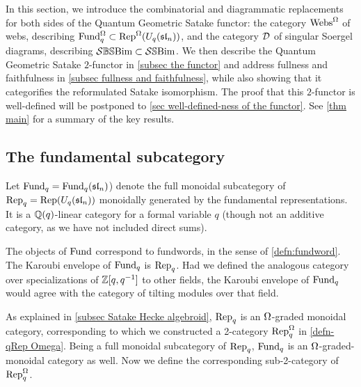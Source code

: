 In this section, we introduce the combinatorial and diagrammatic replacements for both sides of the Quantum Geometric Satake functor: the category $\operatorname{Webs}^{\Omega}$ of webs, describing $\operatorname{Fund}_q^{\Omega} \subset \operatorname{Rep}^{\Omega}(U_q(\mathfrak{sl}_n))$, and the category $\mathcal{D}$ of singular Soergel diagrams, describing $\mathcal{S}\mathbb{BS}\text{Bim} \subset \mathcal{S}\mathbb{S}\text{Bim}$. We then  describe the Quantum Geometric Satake $2$-functor in \cref{subsec the functor} and address fullness and faithfulness in \cref{subsec fullness and faithfulness}, while also showing that it categorifies the reformulated Satake isomorphism. 
The proof that this $2$-functor is well-defined will be postponed to \cref{sec well-defined-ness of the functor}. See \cref{thm main} for a summary of the key results.



\subsection{The fundamental subcategory}\label{subsec the fundamental subcategory}

\begin{defn} Let $\operatorname{Fund}_q = \operatorname{Fund}_q(\mathfrak{sl}_n)$) denote the full monoidal subcategory of $\operatorname{Rep}_q = \operatorname{Rep}(U_q(\mathfrak{sl}_n))$ monoidally generated by the fundamental representations. It is a $\mathbb{Q}(q)$-linear category for a formal variable $q$ (though not an additive category, as we have not included direct sums). \end{defn}

The objects of $\operatorname{Fund}$ correspond to fundwords, in the sense of \cref{defn:fundword}. The Karoubi envelope of $\operatorname{Fund}_q$ is $\operatorname{Rep}_q$. Had we defined the analogous category over specializations of $\mathbb{Z}[q,q^{-1}]$ to other fields, the Karoubi envelope of $\operatorname{Fund}_q$ would agree with the category of tilting modules over that field.

As explained in \cref{subsec Satake Hecke algebroid}, $\operatorname{Rep}_q$ is an $\Omega$-graded monoidal category, corresponding to which we constructed a 2-category $\operatorname{Rep}_q^{\Omega}$ in \cref{defn- qRep Omega}. Being a full monoidal subcategory of $\operatorname{Rep}_q$, $\operatorname{Fund}_q$ is an $\Omega$-graded-monoidal category as well. Now we define the corresponding sub-2-category of $\operatorname{Rep}_q^{\Omega}$.


